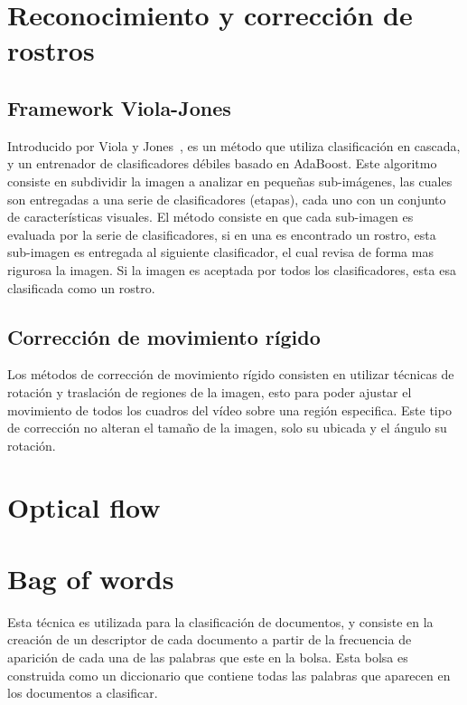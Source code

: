 \section{Reconocimiento y corrección de rostros}
\label{sec:rec_rostros}

	\subsection{Framework Viola-Jones}
	\label{sec:viola-jones}
	Introducido por Viola y Jones~\cite{jones2003fast}, es un método que utiliza clasificación en cascada, y un entrenador de clasificadores débiles basado en AdaBoost. Este algoritmo consiste en subdividir la imagen a analizar en pequeñas sub-imágenes, las cuales son entregadas a una serie de clasificadores (etapas), cada uno con un conjunto de características visuales. El método consiste en que cada sub-imagen es evaluada por la serie de clasificadores, si en una es encontrado un rostro, esta sub-imagen es entregada al siguiente clasificador, el cual revisa de forma mas rigurosa la imagen. Si la imagen es aceptada por todos los clasificadores, esta esa clasificada como un rostro.
	
	\subsection{Corrección de movimiento rígido}
	\label{sec:rigid}
	Los métodos de corrección de movimiento rígido consisten en utilizar técnicas de rotación y traslación de regiones de la imagen, esto para poder ajustar el movimiento de todos los cuadros del vídeo sobre una región especifica. Este tipo de corrección no alteran el tamaño de la imagen, solo su ubicada y el ángulo su rotación.

\section{Optical flow}
\label{sec:optical_flow}

\section{Bag of words}
\label{sec:bag_of_words}
Esta técnica es utilizada para la clasificación de documentos, y consiste en la creación de un descriptor de cada documento a partir de la frecuencia de aparición de cada una de las palabras que este en la bolsa. Esta bolsa es construida como un diccionario que contiene todas las palabras que aparecen en los documentos a clasificar.


